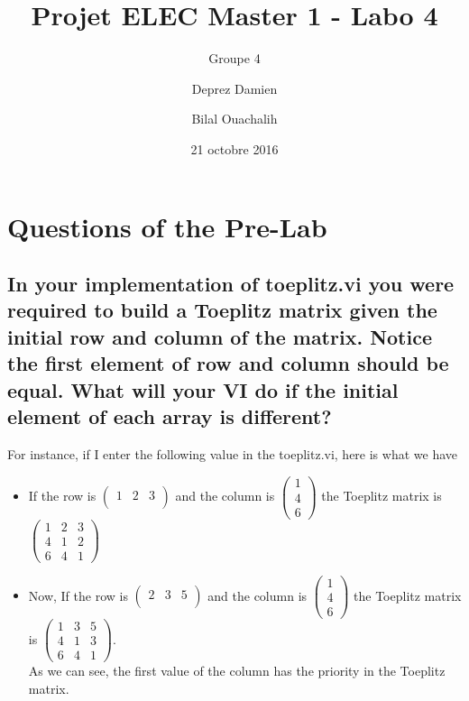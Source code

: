 \documentclass[frenchb, oneside, headings=normal]{scrartcl}
\begin{document}
\title{Projet ELEC Master 1 - Labo 4}
\subtitle{Groupe 4}
\author{Deprez Damien \and Bilal Ouachalih }
\date{21 octobre 2016}
\maketitle


\section{Questions of the Pre-Lab}

\subsection{In your implementation of toeplitz.vi you were required to build a Toeplitz matrix given the initial row and column of the matrix. Notice the first element of row and column should be equal. What will
your VI do if the initial element of each array is different?} 


For instance, if I enter the following value in the toeplitz.vi, here is what we have\\
\begin{itemize}
\item If the row is $\begin{pmatrix}1 & 2 & 3\\ \end{pmatrix}$
	  and the column is $\begin{pmatrix}1\\4\\6 \end{pmatrix}$
 	  the Toeplitz matrix is $\begin{pmatrix}1 & 2 & 3\\4 & 1 & 2\\6 & 4 & 1
      \end{pmatrix}$\\

\item Now, If the row is $\begin{pmatrix}2 & 3 & 5\\ \end{pmatrix}$
	  and the column is $\begin{pmatrix}1\\4\\6 \end{pmatrix}$
 	  the Toeplitz matrix is $\begin{pmatrix}1 & 3 & 5\\4 & 1 & 3\\6 & 4 & 1
      \end{pmatrix}$.\newline \\ As we can see, the first value of the column     	  has the priority in the Toeplitz matrix.

\end{itemize}
\end{document}
